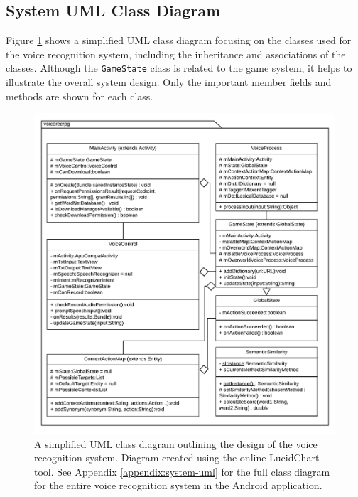 \documentclass[11pt]{article}
\begin{document}
\subsection{System UML Class Diagram}

Figure \ref{fig:system-overview} shows a simplified UML class diagram focusing on the classes used for the voice recognition system, including the inheritance and associations of the classes. Although the \texttt{GameState} class is related to the game system, it helps to illustrate the overall system design. Only the important member fields and methods are shown for each class.

\begin{center}
\begin{figure}[H]
\begin{center}
  \includegraphics[width=\linewidth]{system-overview.pdf}
  \caption{A simplified UML class diagram outlining the design of the voice recognition system. Diagram created using the online LucidChart tool. See Appendix \ref{appendix:system-uml} for the full class diagram for the entire voice recognition system in the Android application.}
  \label{fig:system-overview}
  \end{center}
\end{figure}
\end{center}
\end{document}
